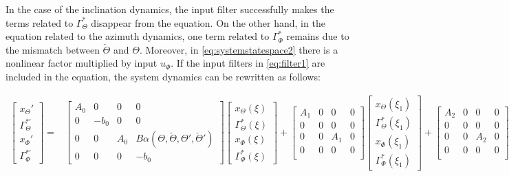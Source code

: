 \documentclass[main.tex]{subfiles}
\begin{document}
	
	In the case of the inclination dynamics, the input filter successfully makes the terms related to $\Gamma_\Theta^*$ disappear from the equation. On the other hand, in the equation related to the azimuth dynamics, one term related to $\Gamma_\Phi^*$ remains due to the mismatch between $\check{\Theta}$ and $\Theta$. Moreover, in \eqref{eq:systemstatespace2} there is a nonlinear factor multiplied by input $u_\Phi$. If the input filters in \eqref{eq:filter1} are included in the equation, the system dynamics can be rewritten as follows:
	
	\begin{align}
	\begin{bmatrix}
	x_\Theta' \\
	\Gamma_\Theta^{*'} \\
	x_\Phi' \\
	\Gamma_\Phi^{*'} 
	\end{bmatrix} =&
	\begin{bmatrix}
	A_0 & 0 & 0 & 0\\
	0 & -b_0 & 0 & 0 \\
	0 & 0 & A_0 & B\alpha(\Theta,\check{\Theta},\Theta',\check{\Theta}') \\
	0 & 0 & 0 & -b_0
	\end{bmatrix}
	\begin{bmatrix}
	x_\Theta(\xi) \\
	\Gamma_\Theta^{*}(\xi) \\
	x_\Phi(\xi) \\
	\Gamma_\Phi^{*} (\xi)
	\end{bmatrix} + 
	\begin{bmatrix}
	A_1 & 0 & 0 & 0\\
	0 & 0 & 0 & 0 \\
	0 & 0 & A_1 & 0 \\
	0 & 0 & 0 & 0 \\
	\end{bmatrix}
	\begin{bmatrix}
	x_\Theta(\xi_1) \\
	\Gamma_\Theta^{*}(\xi_1) \\
	x_\Phi(\xi_1) \\
	\Gamma_\Phi^{*} (\xi_1)
	\end{bmatrix} +
	\begin{bmatrix}
	A_2 & 0 & 0 & 0 \\
	0 & 0 & 0 & 0 \\
	0 & 0 & A_2 & 0 \\
	0 & 0 & 0 & 0 \\
	\end{bmatrix}

\end{align}
\end{document}
